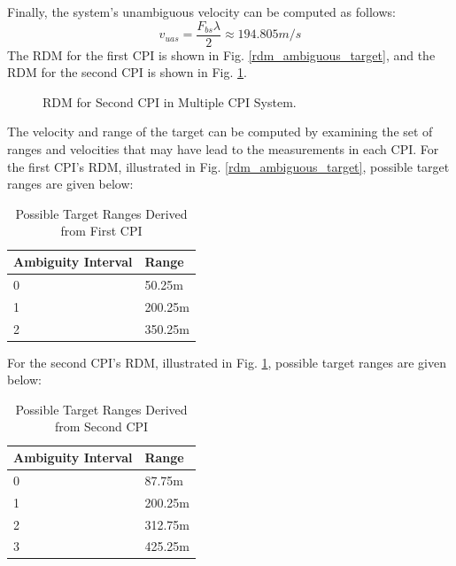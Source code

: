 \documentclass[conference]{IEEEtran}
\begin{document}
Finally, the system's unambiguous velocity can be computed as follows:
\begin{equation}
v_{uas} = \frac{F_{bs}\lambda}{2} \approx 194.805m/s
\end{equation}
The RDM for the first CPI is shown in Fig. \ref{rdm_ambiguous_target}, and the RDM for the second CPI is shown in Fig. \ref{multiple_cpi_rdm}.
\begin{figure}[H]
\centerline{}
\caption{RDM for Second CPI in Multiple CPI System.}
\label{multiple_cpi_rdm}
\end{figure}
\noindent
The velocity and range of the target can be computed by examining the set of ranges and velocities that may have lead to the measurements in each CPI. For the first CPI's RDM, illustrated in Fig. \ref{rdm_ambiguous_target}, possible target ranges are given below:
\begin{table}[H]
\caption{Possible Target Ranges Derived from First CPI}
\label{Range CPI0}
\begin{tabularx}{0.5\textwidth}{| X | X |}
\hline
Ambiguity Interval & Range \\
\hline
0 & 50.25m \\
\hline
1 & 200.25m \\
\hline
2 & 350.25m \\
\hline
\end{tabularx}
\end{table}
\noindent
For the second CPI's RDM, illustrated in Fig. \ref{multiple_cpi_rdm}, possible target ranges are given below:
\begin{table}[H]
\caption{Possible Target Ranges Derived from Second CPI}
\label{Range CPI1}
\begin{tabularx}{0.5\textwidth}{| X | X |}
\hline
Ambiguity Interval & Range \\
\hline
0 & 87.75m \\
\hline
1 & 200.25m \\
\hline
2 & 312.75m \\
\hline
3 & 425.25m \\
\hline
\end{tabularx}
\end{table}
\end{document}
